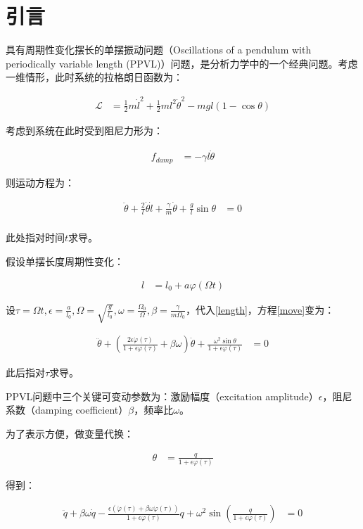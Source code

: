 \section{引言}

具有周期性变化摆长的单摆振动问题（Oscillations of a pendulum with periodically variable length (PPVL)）问题，是分析力学中的一个经典问题\cite{belyakov_nonlinear_2009}。考虑一维情形，此时系统的拉格朗日函数为：

\begin{align}
    \mathcal{L} &= \frac{1}{2}m\dot{l}^{2}+\frac{1}{2}ml^{2}\dot{\theta}^{2}-mgl(1-\cos\theta)
\end{align}

考虑到系统在此时受到阻尼力形为：

\begin{align}
    f_{damp} &= -\gamma l\dot{\theta}
\end{align}

则运动方程为：

\begin{align}
    \ddot{\theta}+\frac{2}{l}\dot{\theta}\dot{l}+\frac{\gamma}{m}\dot{\theta}+\frac{g}{l}\sin\theta &= 0 \label{move} \\
\end{align}

此处$\dot{}$指对时间$t$求导。

假设单摆长度周期性变化：

\begin{align}
    l &= l_{0} +a\varphi(\Omega t) \label{length}
\end{align}

设$\tau=\Omega t,\epsilon=\frac{a}{l_{0}},\Omega=\sqrt{\frac{g}{l_{0}}},\omega=\frac{\Omega_{0}}{\Omega},\beta=\frac{\gamma}{m\Omega_{0}}$，代入\eqref{length}，方程\eqref{move}变为：

\begin{align}
    \ddot{\theta}+\left(\frac{2\epsilon\dot{\varphi}(\tau)}{1+\epsilon\varphi(\tau)}+\beta\omega\right)\dot{\theta}+\frac{\omega^{2}\sin\theta}{1+\epsilon\varphi(\tau)} &= 0
\end{align}

此后$\dot{}$指对$\tau$求导。

PPVL问题中三个关键可变动参数为：激励幅度（excitation amplitude）$\epsilon$，阻尼系数（damping coefficient）$\beta$，频率比$\omega$。

为了表示方便，做变量代换：

\begin{align}
    \theta &= \frac{q}{1+\epsilon\varphi(\tau)}
\end{align}

得到：

\begin{align}
    \ddot{q}+\beta\omega\dot{q}-\frac{\epsilon(\ddot{\varphi}(\tau)+\beta\omega\dot{\varphi}(\tau))}{1+\epsilon\varphi(\tau)}q+\omega^{2}\sin\left(\frac{q}{1+\epsilon\varphi(\tau)}\right) &= 0 \label{set}
\end{align}